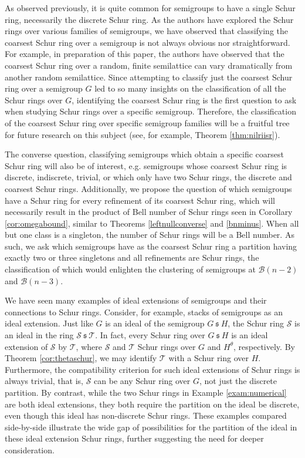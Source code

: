 \documentclass{article}
\theoremstyle{plain}
\theoremstyle{definition}
\newcommand{\thmref}[1]{Theorem \ref{#1}}
\newcommand{\corref}[1]{Corollary \ref{#1}}
\renewcommand{\S}{\mathcal{S}}
\newcommand{\T}{\mathcal{T}}
\newcommand{\B}{\mathscr{B}}
\newcommand{\s}{\ \mathfrak{s}\ }
\begin{document}
As observed previously, it is quite common for semigroups to have a single Schur ring, necessarily the discrete Schur ring. As the authors have explored the Schur rings over various families of semigroups, we have observed that classifying the coarsest Schur ring over a semigroup is not always obvious nor straightforward. For example, in preparation of this paper, the authors have observed that the coarsest Schur ring over a random, finite semilattice can vary dramatically from another random semilattice. Since attempting to classify just the coarsest Schur ring over a semigroup $G$ led to so many insights on the classification of all the Schur rings over $G$, identifying the coarsest Schur ring is the first question to ask when studying Schur rings over a specific semigroup. Therefore, the classification of the coarsest Schur ring over specific semigroup families will be a fruitful tree for future research on this subject (see, for example, Theorem \ref{thm:nilriisr}). 

The converse question, classifying semigroups which obtain a specific coarsest Schur ring will also be of interest, e.g. semigroups whose coarsest Schur ring is discrete, indiscrete, trivial, or which only have two Schur rings, the discrete and coarsest Schur rings. Additionally, we propose the question of which semigroups have a Schur ring for every refinement of its coarsest Schur ring, which will necessarily result in the product of Bell number of Schur rings seen in \corref{cor:omegabound}, similar to Theorems \ref{leftnullconverse} and \ref{bnminus}. When all but one class is a singleton, the number of Schur rings will be a Bell number. As such, we ask which semigroups have as the coarsest Schur ring a partition having exactly two or three singletons and all refinements are Schur rings, the classification of which would enlighten the clustering of semigroups at $\B(n-2)$ and $\B(n-3)$.

We have seen many examples of ideal extensions of semigroups and their connections to Schur rings. Consider, for example, stacks of semigroups as an ideal extension. Just like $G$ is an ideal of the semigroup $G\s H$, the Schur ring $\S$ is an ideal in the ring $\S\s\T$. In fact, every Schur ring over $G\s H$ is an ideal extension of $\S$ by $\T$, where $\S$ and $\T$ Schur rings over $G$ and $H^\theta$, respectively. By \thmref{cor:thetaschur}, we may identify $\T$ with a Schur ring over $H$. Furthermore, the compatibility criterion for such ideal extensions of Schur rings is always trivial, that is, $\S$ can be any Schur ring over $G$, not just the discrete partition. By contrast, while the two Schur rings in Example \ref{exam:numerical} are both ideal extensions, they both require the partition on the ideal be discrete, even though this ideal has non-discrete Schur rings. These examples compared side-by-side illustrate the wide gap of possibilities for the partition of the ideal in these ideal extension Schur rings, further suggesting the need for deeper consideration.
\end{document}
